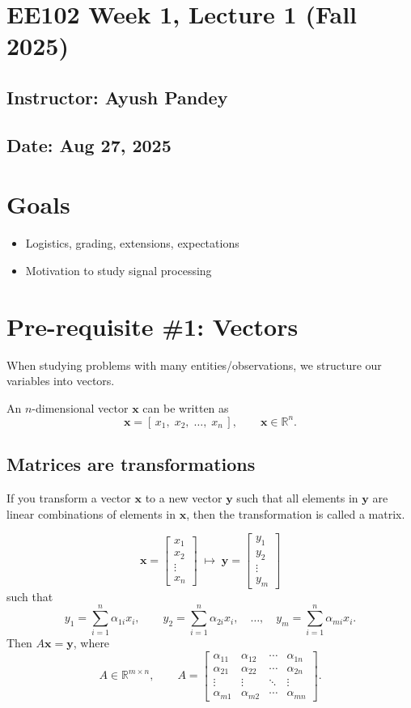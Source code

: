 \documentclass{ee102_notes}
\begin{document}
\section*{EE102 Week 1, Lecture 1 (Fall 2025)}
\subsection*{Instructor: Ayush Pandey}
\subsection*{Date: Aug 27, 2025}
\section{Goals}
\begin{itemize}
  \item Logistics, grading, extensions, expectations
  \item Motivation to study signal processing
\end{itemize}

\section{Pre-requisite \#1: Vectors}
When studying problems with many entities/observations, we structure our variables into vectors.

An $n$-dimensional vector $\mathbf{x}$ can be written as
\[
\mathbf{x}=[\,x_1,\;x_2,\;\ldots,\;x_n\,], \qquad \mathbf{x}\in\mathbb{R}^n .
\]

\subsection*{Matrices are transformations}
If you transform a vector $\mathbf{x}$ to a new vector $\mathbf{y}$ such that all elements in $\mathbf{y}$ are linear combinations of elements in $\mathbf{x}$, then the transformation is called a matrix.

\[
\mathbf{x}=
\begin{bmatrix}
x_1\\ x_2\\ \vdots\\ x_n
\end{bmatrix}
\;\longmapsto\;
\mathbf{y}=
\begin{bmatrix}
y_1\\ y_2\\ \vdots\\ y_m
\end{bmatrix}
\]
such that
\[
y_1=\sum_{i=1}^{n}\alpha_{1i}x_i,\qquad
y_2=\sum_{i=1}^{n}\alpha_{2i}x_i,\quad \ldots,\quad
y_m=\sum_{i=1}^{n}\alpha_{mi}x_i .
\]
Then $A\mathbf{x}=\mathbf{y}$, where
\[
A\in\mathbb{R}^{m\times n}, \qquad
A=
\begin{bmatrix}
\alpha_{11} & \alpha_{12} & \cdots & \alpha_{1n}\\
\alpha_{21} & \alpha_{22} & \cdots & \alpha_{2n}\\
\vdots      & \vdots      & \ddots & \vdots\\
\alpha_{m1} & \alpha_{m2} & \cdots & \alpha_{mn}
\end{bmatrix}.
\]
\end{document}
